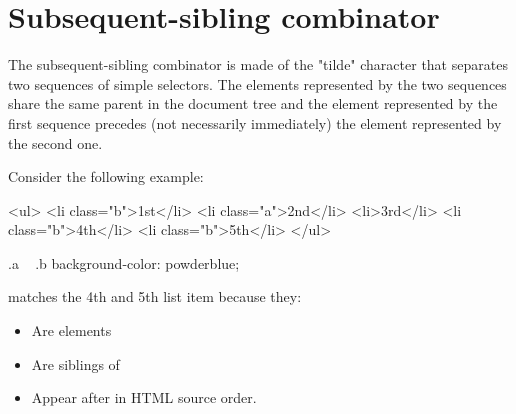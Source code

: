 \documentclass{report}
\begin{document}
    \bigbreak \noindent 
    \section{\LARGE Subsequent-sibling combinator}
    \bigbreak \noindent 
    \begin{concept}
        The subsequent-sibling combinator is made of the "tilde" character that separates two sequences of simple selectors. The elements represented by the two sequences share the same parent in the document tree and the element represented by the first sequence precedes (not necessarily immediately) the element represented by the second one.
    \end{concept}
    \bigbreak \noindent 
    Consider the following example:
    \bigbreak \noindent 
    \begin{htmlcode}
     <ul>
      <li class="b">1st</li>
      <li class="a">2nd</li>
      <li>3rd</li>
      <li class="b">4th</li>
      <li class="b">5th</li>
    </ul>   
    \end{htmlcode}
    \bigbreak \noindent 
    \begin{csscode}
        .a ~ .b {
          background-color: powderblue;
        }
    \end{csscode}
    \hspace{-.25in} matches the 4th and 5th list item because they: \hspace{.2in}
    \begin{itemize}
        \item Are  elements
        \item Are siblings of 
        \item Appear after  in HTML source order.
    \end{itemize}

    \pagebreak \bigbreak \noindent 
\end{document}
